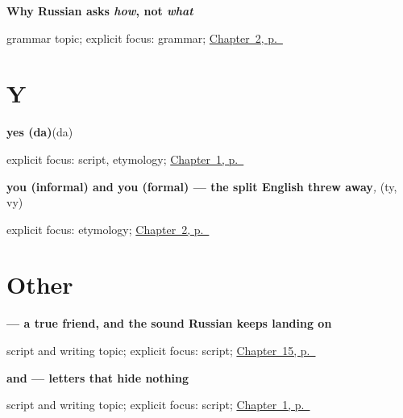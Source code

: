 \noindent\begin{minipage}[t]{\linewidth}
\raggedright
\textbf{Why Russian asks \emph{how}, not \emph{what}}\par
\footnotesize grammar topic; explicit focus: grammar; \hyperref[ch:russian-introductions]{Chapter~2, p.~\pageref*{ch:russian-introductions}}
\end{minipage}\par\smallskip

\section*{Y}

\noindent\begin{minipage}[t]{\linewidth}
\raggedright
\textbf{yes (da)}\enspace\emph{}\enspace(da)\par
\footnotesize explicit focus: script, etymology; \hyperref[ch:russian-greetings]{Chapter~1, p.~\pageref*{ch:russian-greetings}}
\end{minipage}\par\smallskip

\noindent\begin{minipage}[t]{\linewidth}
\raggedright
\textbf{you (informal) and you (formal) — the split English threw away}\enspace\emph{, }\enspace(ty, vy)\par
\footnotesize explicit focus: etymology; \hyperref[ch:russian-introductions]{Chapter~2, p.~\pageref*{ch:russian-introductions}}
\end{minipage}\par\smallskip

\section*{Other}

\noindent\begin{minipage}[t]{\linewidth}
\raggedright
\textbf{ — a true friend, and the sound Russian keeps landing on}\par
\footnotesize script and writing topic; explicit focus: script; \hyperref[ch:ru-script-eight]{Chapter~15, p.~\pageref*{ch:ru-script-eight}}
\end{minipage}\par\smallskip

\noindent\begin{minipage}[t]{\linewidth}
\raggedright
\textbf{ and  — letters that hide nothing}\par
\footnotesize script and writing topic; explicit focus: script; \hyperref[ch:russian-greetings]{Chapter~1, p.~\pageref*{ch:russian-greetings}}
\end{minipage}\par\smallskip

